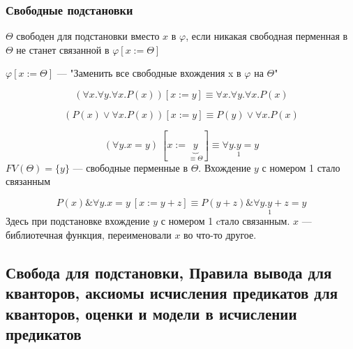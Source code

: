 \documentclass[english]{article}
\begin{document}
\subsubsection{Свободные подстановки}
\label{sec:org5d02cb6}
\begin{definition}
	\(\Theta\) свободен для подстановки вместо \(x\) в \(\varphi\), если никакая свободная перменная в \(\Theta\) не станет связанной в \(\varphi[x := \Theta]\)
\end{definition}
\begin{definition}
	\(\varphi[x := \Theta]\) --- "Заменить все свободные вхождения x в \(\varphi\) на \(\Theta\)"
\end{definition}
\begin{examp}
	\[ (\forall x. \forall y. \forall x. P(x))[x := y] \equiv \forall x. \forall y. \forall x. P(x) \]
\end{examp}
\begin{examp}
	\[ (P(x) \vee \forall x. P(x))[x := y] \equiv P(y) \vee \forall x. P(x) \]
\end{examp}
\begin{examp}
	\[ (\forall y. x = y)\ [x := \underbrace{y}_{\equiv \Theta}] \equiv \forall y. \underset{1}{y} = y\]
	\(FV(\Theta) = \{y\}\) --- свободные перменные в \(\Theta\). Вхождение \(y\) с номером 1 стало связанным
\end{examp}
\begin{examp}
	\[ P(x) \& \forall y. x = y\ [x := y + z] \equiv P(y + z) \& \forall y. \underset{1}{y} + z = y \]
	Здесь при подстановке вхождение \(y\) с номером 1 cтало связанным. \(x\) --- библиотечная функция, переименовали \(x\) во что-то другое.
\end{examp}
\subsection{Свобода для подстановки, Правила вывода для кванторов, аксиомы исчисления предикатов для кванторов, оценки и модели в исчислении предикатов}
\label{sec:orge85d7cd}
\end{document}
